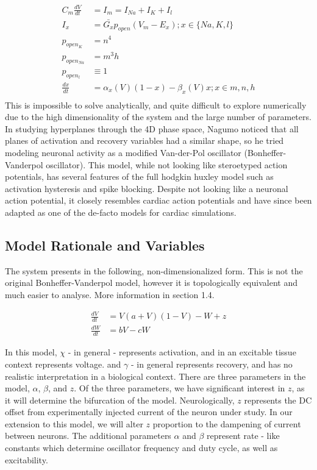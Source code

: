 \documentclass[11pt]{article}
\begin{document}
\begin{align}
C_m \frac{dV}{dt} &= I_m = I_{Na} + I_{K} + I_l \\
I_x &= \bar{G_x}p_{open}(V_m-E_x); x\in\{Na,K,l\}\\
p_{open_{K}} &= n^4\\
p_{open_{Na}} &= m^3h\\
p_{open_{l}} &\equiv 1\\
\frac{dx}{dt} &= \alpha_x(V)(1-x)-\beta_x(V)x; x\in{m,n,h}\\
\end{align}
This is impossible to solve analytically, and quite difficult to explore numerically due to the high dimensionality of the system and the large number of parameters. In studying hyperplanes through the 4D phase space, Nagumo noticed that all planes of activation and recovery variables had a similar shape, so he tried modeling neuronal activity as a modified Van-der-Pol oscillator (Bonheffer-Vanderpol oscillator). This model, while not looking like steroetyped action potentials, has several features of the full hodgkin huxley model such as activation hysteresis and spike blocking. Despite not looking like a neuronal action potential, it closely resembles cardiac action potentials and have since been adapted as one of the de-facto models for cardiac simulations. 


\subsection{Model Rationale and Variables}

The system presents in the following, non-dimensionalized form. This is not the original Bonheffer-Vanderpol model, however it is topologically equivalent and much easier to analyse. More information in section 1.4.

\begin{align} \frac{dV}{dt} &= V(a+V)(1-V) -W + z \\
\frac{dW}{dt} &= bV-cW \end{align}

In this model, $\chi$ - in general - represents activation, and in an excitable tissue context represents voltage. and $\gamma$ - in general represents recovery, and has no realistic interpretation in a biological context. There are three parameters in the model, $\alpha$, $\beta$, and $z$. Of the three parameters, we have significant interest in $z$, as it will determine the bifurcation of the model. Neurologically, $z$ represents the DC offset from experimentally injected current of the neuron under study. In our extension to this model, we will alter $z$ proportion to the dampening of current between neurons. The additional parameters $\alpha$ and $\beta$ represent rate - like constants which determine oscillator frequency and duty cycle, as well as excitability.
\end{document}

